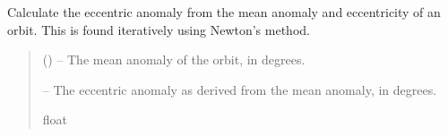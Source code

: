 \documentclass[letterpaper,11pt,english]{sphinxmanual}
\begin{document}
\begin{savenotes}\begin{fulllineitems}
\label{\detokenize{code/opihiexarata.orbit.solution:opihiexarata.orbit.solution._calculate_eccentric_anomaly}}
\pysigstartsignatures
{}
\pysigstopsignatures
\sphinxAtStartPar
Calculate the eccentric anomaly from the mean anomaly and eccentricity
of an orbit. This is found iteratively using Newton’s method.
\begin{quote}\begin{description}
\sphinxAtStartPar
{} () – The mean anomaly of the orbit, in degrees.

\sphinxAtStartPar
{} – The eccentric anomaly as derived from the mean anomaly, in degrees.

\sphinxAtStartPar
float

\end{description}\end{quote}

\end{fulllineitems}\end{savenotes}

\end{document}
